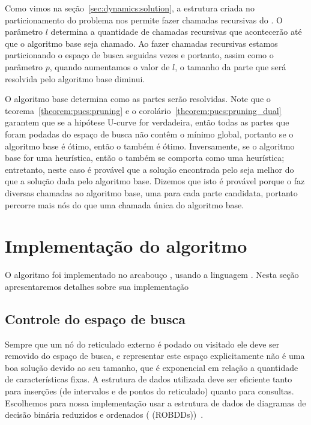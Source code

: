 Como vimos na seção~\ref{sec:dynamics:solution}, a estrutura criada no
particionamento do problema nos permite fazer chamadas recursivas do 
. O parâmetro $l$ determina a quantidade de chamadas 
recursivas que acontecerão até que o algoritmo base seja chamado. Ao 
fazer chamadas recursivas estamos particionando o espaço de busca 
seguidas vezes e portanto, assim como o parâmetro $p$, quando aumentamos 
o valor de $l$, o tamanho da parte que será resolvida pelo algoritmo 
base diminui. 

O algoritmo base determina como as partes serão resolvidas. Note que o 
teorema~\ref{theorem:pucs:pruning} e o corolário~\ref{theorem:pucs:pruning_dual}
garantem que se a hipótese U-curve for verdadeira, então todas as partes
que foram podadas do espaço de busca não contêm o mínimo global, 
portanto se o algoritmo base é ótimo, então o  também é
ótimo. Inversamente, se o algoritmo base for uma heurística, então o 
também se comporta como uma heurística; entretanto, neste caso é provável que a 
solução encontrada pelo  seja melhor do que a solução 
dada pelo algoritmo base. Dizemos que isto é provável porque o 
 faz diversas chamadas ao algoritmo base, uma para cada
parte candidata, portanto percorre mais nós do que uma chamada única do
algoritmo base.

\section{Implementação do algoritmo}
O algoritmo  foi implementado no arcabouço 
\href{https://github.com/msreis/featsel}{}, usando a linguagem . Nesta seção 
apresentaremos detalhes sobre sua implementação 

\subsection{Controle do espaço de busca}
Sempre que um nó do reticulado externo é podado ou visitado ele deve ser
removido do espaço de busca, e representar este espaço explicitamente 
não é uma boa solução devido ao seu tamanho, que é exponencial em 
relação a quantidade de características fixas. A estrutura de dados 
utilizada deve ser eficiente tanto para inserções (de intervalos e de 
pontos do reticulado) quanto para consultas. Escolhemos para nossa 
implementação usar a estrutura de dados de diagramas de decisão binária
reduzidos e ordenados ( (ROBDDs))~\cite{Bry86}.

